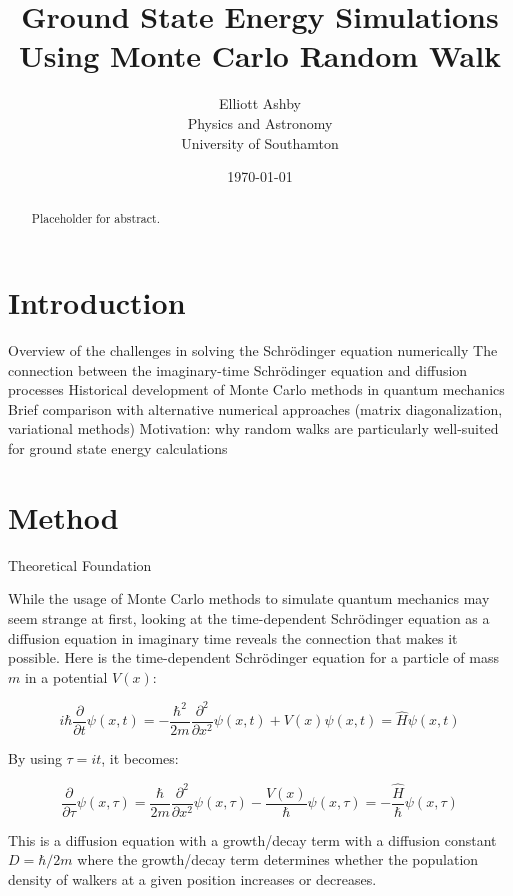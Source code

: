 \documentclass[reqno]{amsart}
\title{Ground State Energy Simulations Using Monte Carlo Random Walk}
\author[Elliott Ashby]{Elliott Ashby \\ Physics and Astronomy \\ University of Southamton}
\date{\monthyeardate\today}
\makeatletter
\renewcommand\subsection{\@startsection{subsection}{2}%
  \z@{.5\linespacing\@plus.7\linespacing}{-.5em}%
  {\normalfont\scshape\justify}}
\numberwithin{equation}{section}
\numberwithin{figure}{section}
\makeatother
\begin{document}
\begin{abstract}
    Placeholder for abstract.
\end{abstract}
\maketitle
\tableofcontents
\newpage
\section{Introduction}
Overview of the challenges in solving the Schrödinger equation numerically
The connection between the imaginary-time Schrödinger equation and diffusion processes
Historical development of Monte Carlo methods in quantum mechanics
Brief comparison with alternative numerical approaches (matrix diagonalization, variational methods)
Motivation: why random walks are particularly well-suited for ground state energy calculations

\section{Method}
\subsection{Theoretical Foundation}

While the usage of Monte Carlo methods to simulate quantum mechanics may seem strange at first, looking at the time-dependent Schrödinger equation as a diffusion equation in imaginary time reveals the connection that makes it possible. Here is the time-dependent Schrödinger equation for a particle of mass $m$ in a potential $V(x)$:

\begin{equation}
    i\hbar\frac{\partial}{\partial t}\psi(x,t) = -\frac{\hbar^2}{2m}\frac{\partial^2}{\partial x^2}\psi(x,t) + V(x)\psi(x,t) = \hat{H}\psi(x,t)
\end{equation}

By using $\tau = it$, it becomes:

\begin{equation}
    \frac{\partial}{\partial \tau}\psi(x,\tau) = \frac{\hbar}{2m}\frac{\partial^2}{\partial x^2}\psi(x,\tau) - \frac{V(x)}{\hbar}\psi(x,\tau) = -\frac{\hat{H}}{\hbar}\psi(x,\tau)
    \label{eq:diffusion}
\end{equation}

This is a diffusion equation with a growth/decay term with a diffusion constant $D = \hbar/2m$ where the growth/decay term determines whether the population density of walkers at a given position increases or decreases. 
\end{document}
